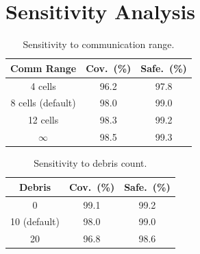\documentclass[11pt,twocolumn]{article}
\theoremstyle{definition}
\begin{document}
\section{Sensitivity Analysis}

\begin{table}[h]
\centering
\caption{Sensitivity to communication range.}
\small
\begin{tabular}{ccc}
\toprule
\textbf{Comm Range} & \textbf{Cov.\ (\%)} & \textbf{Safe.\ (\%)} \\
\midrule
4 cells & 96.2 & 97.8 \\
8 cells (default) & 98.0 & 99.0 \\
12 cells & 98.3 & 99.2 \\
$\infty$ & 98.5 & 99.3 \\
\bottomrule
\end{tabular}
\end{table}

\begin{table}[h]
\centering
\caption{Sensitivity to debris count.}
\small
\begin{tabular}{ccc}
\toprule
\textbf{Debris} & \textbf{Cov.\ (\%)} & \textbf{Safe.\ (\%)} \\
\midrule
0 & 99.1 & 99.2 \\
10 (default) & 98.0 & 99.0 \\
20 & 96.8 & 98.6 \\
\bottomrule
\end{tabular}
\end{table}
\end{document}
